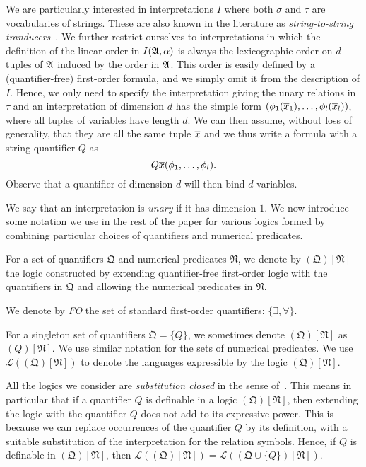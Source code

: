 \documentclass[a4paper,UKenglish,cleveref, autoref, thm-restate, anonymous]{lipics-v2021}
\begin{document}
We are particularly interested in interpretations $I$ where both $\sigma$ and $\tau$ are vocabularies of strings.  These are also known in the literature as \emph{string-to-string tranducers}~\cite{CITE3}.    We further restrict ourselves to interpretations in which the definition of the linear order in $I(\mathfrak{A},\alpha)$ is always the lexicographic order on $d$-tuples of $\mathfrak{A}$ induced by the order in $\mathfrak{A}$.  This order is easily defined by a (quantifier-free) first-order formula, and we simply omit it from the description of $I$.  Hence, we only need to specify the interpretation giving the unary relations in $\tau$ and an interpretation of dimension $d$ has the simple form $(\phi_1(\overline{x}_1),\ldots, \phi_l(\overline{x}_l))$, where all tuples of variables have length $d$.  We can then assume, without loss of generality, that they are all the same tuple $\overline{x}$ and we thus write a formula with a string quantifier $Q$ as
$$Q \overline{x} (\phi_1,\ldots,\phi_l).$$
\noindent Observe that a quantifier of dimension $d$ will then bind $d$ variables.

We say that an interpretation is \emph{unary} if it has dimension $1$.  We now introduce some notation we use in the rest of the paper for various logics formed by combining particular choices of quantifiers and numerical predicates.
\begin{definition}
  For a set of quantifiers $\mathfrak{Q}$ and numerical predicates $\mathfrak{N}$, we denote by $(\mathfrak{Q})[\mathfrak{N}]$ the logic constructed by extending quantifier-free first-order logic with the quantifiers in $\mathfrak{Q}$ and allowing the numerical predicates in $\mathfrak{N}$.

   We denote by \emph{FO} the set of standard first-order quantifiers: $\{\exists, \forall\}$.
\end{definition}
    For a singleton set of quantifiers $\mathfrak{Q} = \{Q\}$, we sometimes denote $(\mathfrak{Q})[\mathfrak{N}]$ as $(Q)[\mathfrak{N}]$. We use similar notation for the sets of numerical predicates. We use $\mathcal{L}((\mathfrak{Q})[\mathfrak{N}])$ to denote the languages expressible by the logic $(\mathfrak{Q})[\mathfrak{N}]$.

All the logics we consider are \emph{substitution closed} in the sense of~\cite{Ebb85}.  This means in particular that if a quantifier $Q$ is definable in a logic $(\mathfrak{Q})[\mathfrak{N}]$, then extending the logic with the quantifier $Q$ does not add to its expressive power.  This is because we can replace occurrences of the quantifier $Q$ by its definition, with a suitable substitution of the interpretation for the relation symbols.  Hence, if $Q$ is definable in $(\mathfrak{Q})[\mathfrak{N}]$, then $\mathcal{L}((\mathfrak{Q})[\mathfrak{N}]) = \mathcal{L}((\mathfrak{Q} \cup \{Q\})[\mathfrak{N}])$.
    
\end{document}
